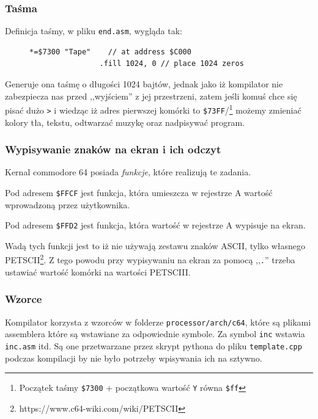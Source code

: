 \documentclass[a4paper,12pt]{article}
\begin{document}
    \subsubsection*{Taśma}

    Definicja taśmy, w pliku \texttt{end.asm}, wygląda tak:

    \begin{figure}[H]
        \begin{lstlisting}[basicstyle=\ttfamily,morekeywords={cpy,bne,dec,dey,fill}]
            *=$7300 "Tape"    // at address $C000
                .fill 1024, 0 // place 1024 zeros
        \end{lstlisting}
    \end{figure}

    Generuje ona taśmę o długości 1024 bajtów, jednak jako iż kompilator nie zabezpiecza nas przed ,,wyjściem'' z jej przestrzeni, zatem jeśli komuś chce się pisać dużo \texttt{>} i wiedząc iż adres pierwszej komórki to \texttt{\$73FF}/\footnote{Początek taśmy \texttt{\$7300} + początkowa wartość \texttt{Y} równa \texttt{\$ff}} możemy zmieniać kolory tła, tekstu, odtwarzać muzykę oraz nadpisywać program.

    \subsubsection*{Wypisywanie znaków na ekran i ich odczyt}

    Kernal commodore 64 posiada \emph{funkcje}, które realizują te zadania.

    Pod adresem \texttt{\$FFCF} jest funkcja, która umieszcza w rejestrze A wartość wprowadzoną przez użytkownika.

    Pod adresem \texttt{\$FFD2} jest funkcja, która wartość w rejestrze A wypisuje na ekran.

    Wadą tych funkcji jest to iż nie używają zestawu znaków ASCII, tylko własnego PETSCII\footnote{https://www.c64-wiki.com/wiki/PETSCII}. Z tego powodu przy wypisywaniu na ekran za pomocą ,,\texttt{.}'' trzeba ustawiać wartość komórki na wartości PETSCIII.

    \subsubsection*{Wzorce}

    Kompilator korzysta z wzorców w folderze \texttt{processor/arch/c64}, które są plikami assemblera które są wstawiane za odpowiednie symbole. Za symbol \texttt{inc} wstawia \texttt{inc.asm} itd. Są one przetwarzane przez skrypt pythona do pliku \texttt{template.cpp} podczas kompilacji by nie było potrzeby wpisywania ich na sztywno.
    
\end{document}
